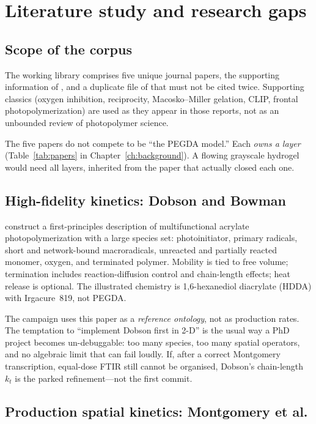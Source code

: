 \chapter{Literature study and research gaps}
\label{ch:literature}

\section{Scope of the corpus}

The working library comprises five unique journal papers, the supporting information of \citet{Dobson2024}, and a duplicate file of \citet{Meenakshisundaram2020} that must not be cited twice.
Supporting classics (oxygen inhibition, reciprocity, Macosko--Miller gelation, CLIP, frontal photopolymerization) are used as they appear in those reports, not as an unbounded review of photopolymer science.

The five papers do not compete to be ``the PEGDA model.''
Each \emph{owns a layer} (Table~\ref{tab:papers} in Chapter~\ref{ch:background}).
A flowing grayscale hydrogel would need all layers, inherited from the paper that actually closed each one.

\section{High-fidelity kinetics: Dobson and Bowman}

\citet{Dobson2024} construct a first-principles description of multifunctional acrylate photopolymerization with a large species set: photoinitiator, primary radicals, short and network-bound macroradicals, unreacted and partially reacted monomer, oxygen, and terminated polymer.
Mobility is tied to free volume; termination includes reaction-diffusion control and chain-length effects; heat release is optional.
The illustrated chemistry is 1,6-hexanediol diacrylate (HDDA) with Irgacure~819, not PEGDA.

The campaign uses this paper as a \emph{reference ontology}, not as production rates.
The temptation to ``implement Dobson first in 2-D'' is the usual way a PhD project becomes un-debuggable: too many species, too many spatial operators, and no algebraic limit that can fail loudly.
If, after a correct Montgomery transcription, equal-dose FTIR still cannot be organised, Dobson's chain-length $k_t$ is the parked refinement---not the first commit.

\section{Production spatial kinetics: Montgomery et al.}


